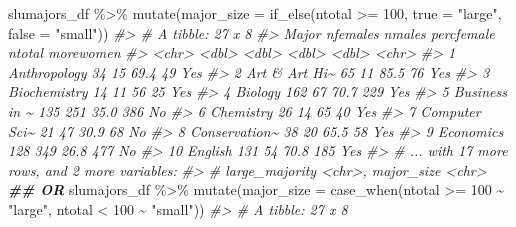 \documentclass[
]{book}
\newenvironment{Shaded}{\begin{snugshade}}{\end{snugshade}}
\newcommand{\AttributeTok}[1]{\textcolor[rgb]{0.77,0.63,0.00}{#1}}
\newcommand{\CommentTok}[1]{\textcolor[rgb]{0.56,0.35,0.01}{\textit{#1}}}
\newcommand{\DecValTok}[1]{\textcolor[rgb]{0.00,0.00,0.81}{#1}}
\newcommand{\DocumentationTok}[1]{\textcolor[rgb]{0.56,0.35,0.01}{\textbf{\textit{#1}}}}
\newcommand{\FunctionTok}[1]{\textcolor[rgb]{0.00,0.00,0.00}{#1}}
\newcommand{\NormalTok}[1]{#1}
\newcommand{\SpecialCharTok}[1]{\textcolor[rgb]{0.00,0.00,0.00}{#1}}
\newcommand{\StringTok}[1]{\textcolor[rgb]{0.31,0.60,0.02}{#1}}
\begin{document}
\begin{Shaded}
\begin{Highlighting}[]
\NormalTok{slumajors\_df }\SpecialCharTok{\%\textgreater{}\%} \FunctionTok{mutate}\NormalTok{(}\AttributeTok{major\_size =} \FunctionTok{if\_else}\NormalTok{(ntotal }\SpecialCharTok{\textgreater{}=} \DecValTok{100}\NormalTok{,}
                                             \AttributeTok{true =} \StringTok{"large"}\NormalTok{,}
                                             \AttributeTok{false =} \StringTok{"small"}\NormalTok{))}
\CommentTok{\#\textgreater{} \# A tibble: 27 x 8}
\CommentTok{\#\textgreater{}    Major         nfemales nmales percfemale ntotal morewomen}
\CommentTok{\#\textgreater{}    \textless{}chr\textgreater{}            \textless{}dbl\textgreater{}  \textless{}dbl\textgreater{}      \textless{}dbl\textgreater{}  \textless{}dbl\textgreater{} \textless{}chr\textgreater{}    }
\CommentTok{\#\textgreater{}  1 Anthropology        34     15       69.4     49 Yes      }
\CommentTok{\#\textgreater{}  2 Art \& Art Hi\textasciitilde{}       65     11       85.5     76 Yes      }
\CommentTok{\#\textgreater{}  3 Biochemistry        14     11       56       25 Yes      }
\CommentTok{\#\textgreater{}  4 Biology            162     67       70.7    229 Yes      }
\CommentTok{\#\textgreater{}  5 Business in \textasciitilde{}      135    251       35.0    386 No       }
\CommentTok{\#\textgreater{}  6 Chemistry           26     14       65       40 Yes      }
\CommentTok{\#\textgreater{}  7 Computer Sci\textasciitilde{}       21     47       30.9     68 No       }
\CommentTok{\#\textgreater{}  8 Conservation\textasciitilde{}       38     20       65.5     58 Yes      }
\CommentTok{\#\textgreater{}  9 Economics          128    349       26.8    477 No       }
\CommentTok{\#\textgreater{} 10 English            131     54       70.8    185 Yes      }
\CommentTok{\#\textgreater{} \# ... with 17 more rows, and 2 more variables:}
\CommentTok{\#\textgreater{} \#   large\_majority \textless{}chr\textgreater{}, major\_size \textless{}chr\textgreater{}}
\DocumentationTok{\#\# OR}
\NormalTok{slumajors\_df }\SpecialCharTok{\%\textgreater{}\%}
  \FunctionTok{mutate}\NormalTok{(}\AttributeTok{major\_size =} \FunctionTok{case\_when}\NormalTok{(ntotal }\SpecialCharTok{\textgreater{}=} \DecValTok{100} \SpecialCharTok{\textasciitilde{}} \StringTok{"large"}\NormalTok{,}
\NormalTok{                                ntotal }\SpecialCharTok{\textless{}} \DecValTok{100} \SpecialCharTok{\textasciitilde{}} \StringTok{"small"}\NormalTok{))}
\CommentTok{\#\textgreater{} \# A tibble: 27 x 8}

\end{Highlighting}
\end{Shaded}
\end{document}
